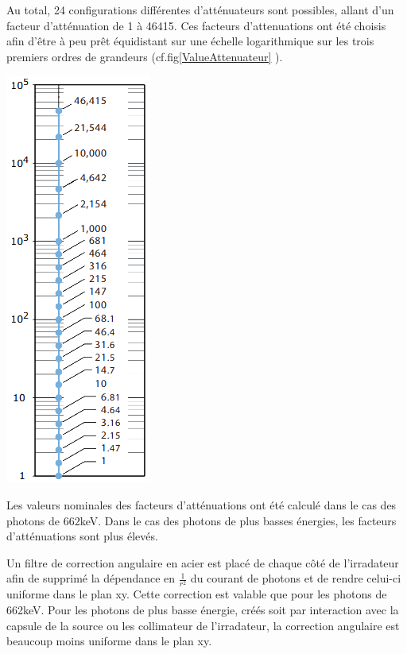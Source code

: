 Au total, 24 configurations différentes d'atténuateurs sont possibles, allant d'un facteur d'atténuation de 1 à 46415. Ces facteurs d'attenuations ont été choisis afin d'être à peu prêt équidistant sur une échelle logarithmique sur les trois premiers ordres de grandeurs (cf.fig\ref{ValueAttenuateur} \cite{Pfeiffer:2016hnl}).

\marginpar
{
	\centering
	\includegraphics[width=1.0\marginparwidth]{GLA/ValueAttenuateur.png}
	\label{ValueAttenuateur}
}

Les valeurs nominales des facteurs d'atténuations ont été calculé dans le cas des photons de $662$keV. Dans le cas des photons de plus basses énergies, les facteurs d'atténuations sont plus élevés. 

Un filtre de correction angulaire en acier est placé de chaque côté de l'irradateur afin de supprimé la dépendance en $\frac{1}{r^2}$ du courant de photons et de rendre celui-ci uniforme dans le plan xy. Cette correction est valable que pour les photons de 662keV. Pour les photons de plus basse énergie, créés soit par interaction avec la capsule de la source ou les collimateur de l'irradateur, la correction angulaire est beaucoup moins uniforme dans le plan xy.

